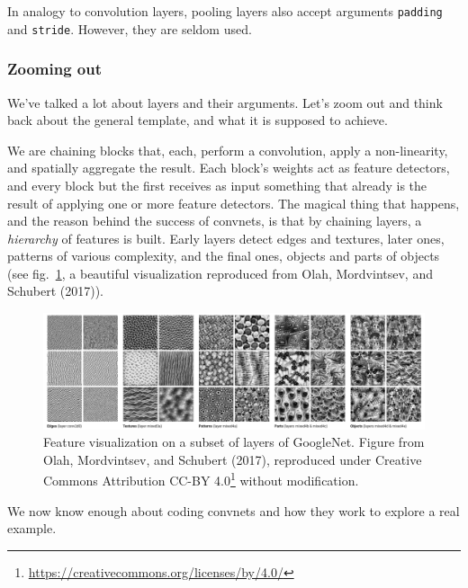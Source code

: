 \documentclass[
  letterpaper,
]{krantz}
\DeclareRobustCommand{\href}[2]{#2\footnote{\url{#1}}}
\begin{document}
In analogy to convolution layers, pooling layers also accept arguments
\texttt{padding} and \texttt{stride}. However, they are seldom used.

\hypertarget{zooming-out}{%
\subsubsection{Zooming out}\label{zooming-out}}

We've talked a lot about layers and their arguments. Let's zoom out and
think back about the general template, and what it is supposed to
achieve.

We are chaining blocks that, each, perform a convolution, apply a
non-linearity, and spatially aggregate the result. Each block's weights
act as feature detectors, and every block but the first receives as
input something that already is the result of applying one or more
feature detectors. The magical thing that happens, and the reason behind
the success of convnets, is that by chaining layers, a \emph{hierarchy}
of features is built. Early layers detect edges and textures, later
ones, patterns of various complexity, and the final ones, objects and
parts of objects (see fig.~\ref{fig-images-feature-visualization}, a
beautiful visualization reproduced from Olah, Mordvintsev, and Schubert
(2017)).

\begin{figure}[H]

{\centering \includegraphics{images/images-feature-visualization.png}

}

\caption{\label{fig-images-feature-visualization}Feature visualization
on a subset of layers of GoogleNet. Figure from Olah, Mordvintsev, and
Schubert (2017), reproduced under
\href{https://creativecommons.org/licenses/by/4.0/}{Creative Commons
Attribution CC-BY 4.0} without modification.}

\end{figure}

We now know enough about coding convnets and how they work to explore a
real example.
\end{document}
